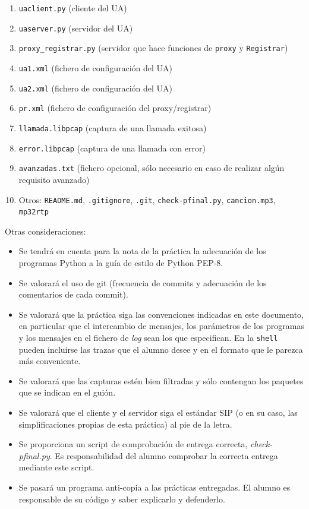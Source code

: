 \documentclass[a4paper,11pt]{article}
\begin{document}
\begin{enumerate}
  \item \texttt{uaclient.py} (cliente del UA)
  \item \texttt{uaserver.py} (servidor del UA)
  \item \texttt{proxy\_registrar.py} (servidor que hace funciones de \texttt{proxy} y \texttt{Registrar})
  \item \texttt{ua1.xml} (fichero de configuración del UA)
  \item \texttt{ua2.xml} (fichero de configuración del UA)
  \item \texttt{pr.xml} (fichero de configuración del proxy/registrar)
  \item \texttt{llamada.libpcap} (captura de una llamada exitosa)
  \item \texttt{error.libpcap} (captura de una llamada con error)
  \item \texttt{avanzadas.txt} (fichero opcional, sólo necesario en caso de realizar algún requisito avanzado)
  \item Otros: \texttt{README.md}, \texttt{.gitignore}, \texttt{.git}, \texttt{check-pfinal.py}, \texttt{cancion.mp3}, \texttt{mp32rtp}
\end{enumerate}

Otras consideraciones:
\begin{itemize}
  \item Se tendrá en cuenta para la nota de la práctica la adecuación de los
programas Python a la guía de estilo de Python PEP-8.
  \item Se valorará el uso de git (frecuencia de commits y adecuación de los comentarios de cada commit).
  \item Se valorará que la práctica siga las
convenciones indicadas en este documento, en particular que el intercambio
de mensajes, los parámetros de los programas y los mensajes en el fichero de \emph{log} sean los
que especifican. En la \texttt{shell} pueden incluirse las trazas que el alumno desee y en el formato que le parezca más conveniente.
  \item Se valorará que las capturas estén bien filtradas y sólo contengan los paquetes que se indican en el guión.
  \item Se valorará que el cliente y el servidor siga el estándar SIP (o en su caso, las simplificaciones propias de esta práctica) al pie de la letra.
  \item Se proporciona un script de comprobación de entrega correcta, \emph{check-pfinal.py}. Es responsabilidad del alumno comprobar la correcta entrega mediante este script.

  \item Se pasará un programa anti-copia a las prácticas entregadas. El alumno es responsable de su código y saber explicarlo y defenderlo.
\end{itemize}
\end{document}
